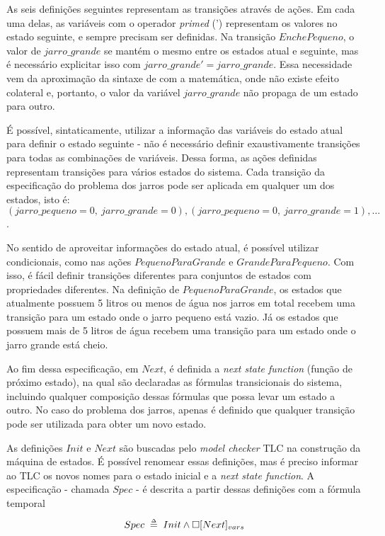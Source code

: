 As seis definições seguintes representam as transições através de ações. Em cada uma delas, as variáveis com o operador \textit{primed} (') representam os valores no estado seguinte, e sempre precisam ser definidas. Na transição $EnchePequeno$, o valor de $jarro\_grande$ se mantém o mesmo entre os estados atual e seguinte, mas é necessário explicitar isso com $jarro\_grande' = jarro\_grande$. Essa necessidade vem da aproximação da sintaxe de \TLA com a matemática, onde não existe efeito colateral e, portanto, o valor da variável $jarro\_grande$ não propaga de um estado para outro.

É possível, sintaticamente, utilizar a informação das variáveis do estado a\-tu\-al para definir o estado seguinte - não é necessário definir exaustivamente transições para todas as combinações de variáveis. Dessa forma, as ações definidas representam transições para vários estados do sistema. Cada transição da especificação do problema dos jarros pode ser aplicada em qualquer um dos estados, isto é: $(jarro\_pequeno = 0,\ jarro\_grande = 0), (jarro\_pequeno = 0,\ jarro\_grande = 1), \dots$.

No sentido de aproveitar informações do estado atual, é possível utilizar condicionais, como nas ações $PequenoParaGrande$ e $GrandeParaPequeno$. Com isso, é fácil definir transições diferentes para conjuntos de estados com propriedades diferentes. Na definição de $PequenoParaGrande$, os estados que atualmente possuem 5 litros ou menos de água nos jarros em total recebem uma transição para um estado onde o jarro pequeno está vazio. Já os estados que possuem mais de 5 litros de água recebem uma transição para um estado onde o jarro grande está cheio.

Ao fim dessa especificação, em $Next$, é definida a \textit{next state function} (função de próximo estado), na qual são declaradas as fórmulas transicionais do sistema, incluindo qualquer composição dessas fórmulas que possa levar um estado a outro. No caso do problema dos jarros, apenas é definido que qualquer transição pode ser utilizada para obter um novo estado.

As definições $Init$ e $Next$ são buscadas pelo \textit{model checker} TLC na construção da máquina de estados. É possível renomear essas definições, mas é preciso informar ao TLC os novos nomes para o estado inicial e a \textit{next state function}. A especificação - chamada $Spec$ - é descrita a partir dessas definições com a fórmula temporal

\[Spec \;\mathrel{\smash {{\stackrel{\scriptscriptstyle\Delta}{=}}}}\; Init \land \square [Next]_{vars}\]


